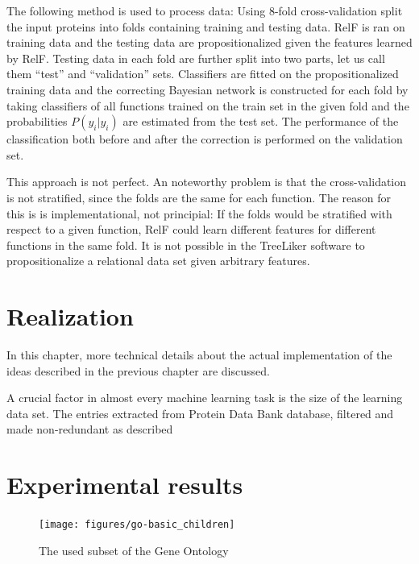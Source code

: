 \documentclass[11pt,twoside,a4paper]{book}
\begin{document}
The following method is used to process data:
Using 8-fold cross-validation split the input proteins into folds
containing training and testing data.
RelF is ran on training data and the testing 
data are propositionalized given the features learned by RelF.
Testing data in each fold are further split into two parts,
let us call them ``test'' and ``validation'' sets.
Classifiers are fitted on the propositionalized training data
and the correcting Bayesian network is constructed
for each fold by taking classifiers of all functions trained
on the train set in the given fold
and the probabilities $P(\hat{y_i}|y_i)$ are estimated from the test set.
The performance of the classification both before and after the correction
is performed on the validation set.

This approach is not perfect. 
An noteworthy problem is that the cross-validation is not stratified,
since the folds are the same for each function.
The reason for this is is implementational, not principial:
If the folds would be stratified with respect to a given 
function, RelF could learn different features for different functions
in the same fold.
It is not possible in the TreeLiker software to 
propositionalize a relational data set given arbitrary features.



\chapter{Realization}
In this chapter, more technical details about the actual implementation 
of the ideas described in the previous chapter are discussed.

A crucial factor in almost every machine learning task is the 
size of the learning data set. 
The entries extracted from Protein Data Bank database, filtered and made non-redundant
as described 

\chapter{Experimental results}

\begin{landscape}
\begin{figure}[h]
\begin{center}
\texttt{[image: figures/go-basic\_children]}
\caption{The used subset of the Gene Ontology}
\label{fig:go}
\end{center}
\end{figure}
\end{landscape}
\end{document}
